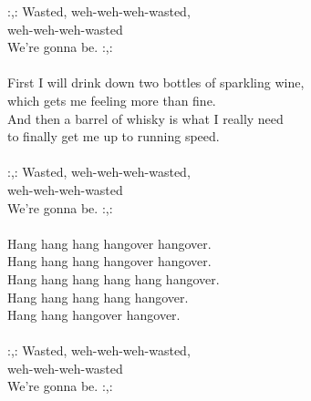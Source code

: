 
:,: Wasted, weh-weh-weh-wasted, 
\\ weh-weh-weh-wasted \\ 
We're gonna be. :,: \\ \hspace{10mm}  \\ First I will drink down two bottles of sparkling wine, \\ which gets me feeling more than fine. \\ And then a barrel of whisky is what I really need \\ to finally get me up to running speed. \\ \hspace{10mm}  \\ :,: Wasted, weh-weh-weh-wasted, \\ weh-weh-weh-wasted \\ We're gonna be. :,: \\ \hspace{10mm} \\ Hang hang hang hangover hangover. \\ Hang hang hang hangover hangover. \\ Hang hang hang hang hang hangover.  \\ Hang hang hang hang hangover. \\ Hang hang hangover hangover. \\ \hspace{10mm} \\ :,: Wasted, weh-weh-weh-wasted, \\ weh-weh-weh-wasted \\ We're gonna be. :,: